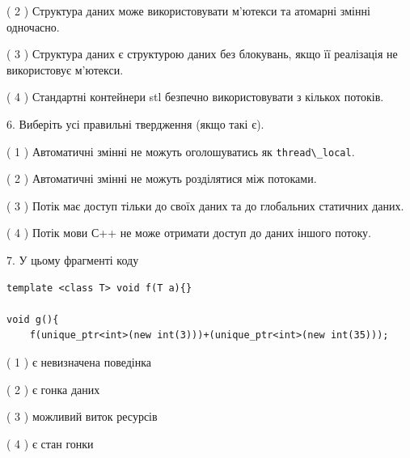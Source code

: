 \documentclass[12pt, ukrainian]{article}
\def\code#1{\Verb!#1!}
\begin{document}
\begin {large}
{( 2 ) Структура даних може використовувати м’ютекси та атомарні змінні одночасно.%

( 3 ) Структура даних є структурою даних без блокувань, якщо її реалізація не використовує м’ютекси.%

( 4 ) Стандартні контейнери stl безпечно використовувати з кількох потоків.%
\newpage



\vspace{5mm}
6. Виберіть усі правильні твердження (якщо такі є).\par
\vspace{2mm}

( 1 ) Автоматичні змінні не можуть оголошуватись як \code{thread\_local}.%

( 2 ) Автоматичні змінні не можуть розділятися між потоками.%

( 3 ) Потік має доступ тільки до своїх даних та до глобальних статичних даних.%

( 4 ) Потік мови С++ не може отримати доступ до даних іншого потоку.%


\vspace{5mm}
7. У цьому фрагменті коду
\begin{verbatim}
template <class T> void f(T a){}

void g(){
    f(unique_ptr<int>(new int(3)))+(unique_ptr<int>(new int(35)));
\end{verbatim}

( 1 ) є невизначена поведінка%

( 2 ) є гонка даних%

( 3 ) можливий виток ресурсів%

( 4 ) є стан гонки%
}
\end {large}
\end{document}
